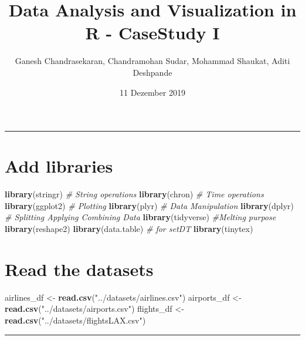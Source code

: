 \documentclass[]{article}
\title{Data Analysis and Visualization in R - CaseStudy I}
\author{Ganesh Chandrasekaran, Chandramohan Sudar, Mohammad Shaukat, Aditi
Deshpande}
\date{11 Dezember 2019}
\newenvironment{Shaded}{\begin{snugshade}}{\end{snugshade}}
\newcommand{\CommentTok}[1]{\textcolor[rgb]{0.56,0.35,0.01}{\textit{#1}}}
\newcommand{\KeywordTok}[1]{\textcolor[rgb]{0.13,0.29,0.53}{\textbf{#1}}}
\newcommand{\NormalTok}[1]{#1}
\newcommand{\StringTok}[1]{\textcolor[rgb]{0.31,0.60,0.02}{#1}}
\begin{document}
\maketitle

\begin{center}\rule{0.5\linewidth}{\linethickness}\end{center}

\hypertarget{add-libraries}{%
\section{Add libraries}\label{add-libraries}}

\begin{Shaded}
\begin{Highlighting}[]
\KeywordTok{library}\NormalTok{(stringr) }\CommentTok{# String operations}
\KeywordTok{library}\NormalTok{(chron) }\CommentTok{# Time operations}
\KeywordTok{library}\NormalTok{(ggplot2) }\CommentTok{# Plotting}
\KeywordTok{library}\NormalTok{(plyr) }\CommentTok{# Data Manipulation}
\KeywordTok{library}\NormalTok{(dplyr) }\CommentTok{# Splitting Applying Combining Data}
\KeywordTok{library}\NormalTok{(tidyverse) }\CommentTok{#Melting purpose}
\KeywordTok{library}\NormalTok{(reshape2)}
\KeywordTok{library}\NormalTok{(data.table) }\CommentTok{# for setDT}
\KeywordTok{library}\NormalTok{(tinytex)}
\end{Highlighting}
\end{Shaded}

\hypertarget{read-the-datasets}{%
\section{Read the datasets}\label{read-the-datasets}}

\begin{Shaded}
\begin{Highlighting}[]
\NormalTok{airlines_df <-}\StringTok{ }\KeywordTok{read.csv}\NormalTok{(}\StringTok{"../datasets/airlines.csv"}\NormalTok{)}
\NormalTok{airports_df <-}\StringTok{ }\KeywordTok{read.csv}\NormalTok{(}\StringTok{"../datasets/airports.csv"}\NormalTok{)}
\NormalTok{flights_df <-}\StringTok{ }\KeywordTok{read.csv}\NormalTok{(}\StringTok{"../datasets/flightsLAX.csv"}\NormalTok{)}
\end{Highlighting}
\end{Shaded}

\begin{center}\rule{0.5\linewidth}{\linethickness}\end{center}
\end{document}
